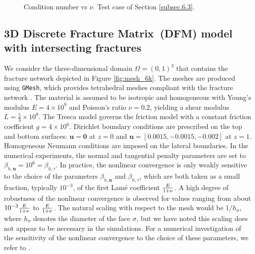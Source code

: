 \documentclass[a4paper,11pt]{article}
\theoremstyle{definition}
\theoremstyle{remark}
\newcommand{\bo}[1]{\mathbf{#1}}
\begin{document}
\begin{figure}[ht]
\centering
\caption{Condition number vs $\nu$. Test case of Section \ref{subsec.6.3}.}\label{figure:conditioning}
\end{figure}

\subsection{3D Discrete Fracture Matrix~(DFM) model with intersecting fractures}\label{subsec.6.4}

We consider the three-dimensional domain $\Omega=(0,1)^3$ that contains the fracture network depicted in Figure \ref{fig:mesh_6k}. The meshes are produced using \texttt{GMesh}, which provides tetrahedral meshes compliant with the fracture network \cite{gmsh}. The material is assumed to be isotropic and homogeneous with Young's modulus $E=4\times 10^9$ and Poisson's ratio $\nu=0.2$, yielding a shear modulus $L=\frac{5}{3}\times 10^9$. The Tresca model governs the friction model with a constant friction coefficient $g=4\times 10^6$. Dirichlet boundary conditions are prescribed on the top and bottom surfaces: $\bo{u}=\bo{0}$ at $z=0$ and $\bo{u}=[0.0015,-0.0015,-0.002]$ at $z=1$. Homogeneous Neumann conditions are imposed on the lateral boundaries. In the numerical experiments, the normal and tangential penalty parameters are set to $\beta_{h,\bo{n}}=10^6=\beta_{h,\tau}.$ 
In practice, the nonlinear convergence is only weakly sensitive to the choice of the parameters $\beta_{h,\bo{n}}$ and $\beta_{h,\tau}$, which are both taken as a small fraction, typically $10^{-3}$, of the first Lam\'e coefficient ${E \over {1 + \nu}}$. A high degree of robustness of the nonlinear convergence is observed for values ranging from about $10^{-3}{E \over {1 + \nu}}$ to ${E \over {1 + \nu}}$. The natural scaling with respect to the mesh would be $1/h_\sigma$, where $h_\sigma$ denotes the diameter of the face $\sigma$, but we have noted this scaling does not appear to be necessary in the simulations. For a numerical investigation of the sensitivity of the nonlinear convergence to the choice of these parameters, we refer to \cite{BDMP:21}.
\end{document}
